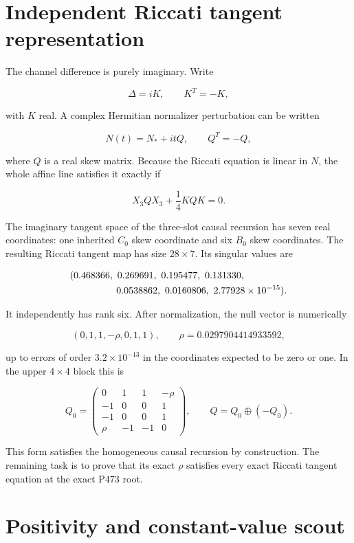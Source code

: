 \documentclass[11pt,a4paper,openany]{report}
\begin{document}
\section{Independent Riccati tangent representation}

The channel difference is purely imaginary. Write

\[
\Delta=iK,
\qquad K^T=-K,
\]

with \(K\) real. A complex Hermitian normalizer perturbation can be written

\[
N(t)=N_*+itQ,
\qquad Q^T=-Q,
\]

where \(Q\) is a real skew matrix. Because the Riccati equation is linear in \(N\), the whole affine line satisfies it exactly if

\[
\boxed{X_3QX_3+\frac14KQK=0.}
\]

The imaginary tangent space of the three-slot causal recursion has seven real coordinates: one inherited \(C_0\) skew coordinate and six \(B_0\) skew coordinates. The resulting Riccati tangent map has size \(28\times7\). Its singular values are

\[
\begin{aligned}
&(0.468366,\ 0.269691,\ 0.195477,\ 0.131330,\\
&\hspace{17mm}0.0538862,\ 0.0160806,\ 2.77928\times10^{-15}).
\end{aligned}
\]

It independently has rank six. After normalization, the null vector is numerically

\[
(0,1,1,-\rho,0,1,1),
\qquad
\rho=0.0297904414933592,
\]

up to errors of order \(3.2\times10^{-13}\) in the coordinates expected to be zero or one. In the upper \(4\times4\) block this is

\[
Q_0=
\begin{pmatrix}
0&1&1&-\rho\\
-1&0&0&1\\
-1&0&0&1\\
\rho&-1&-1&0
\end{pmatrix},
\qquad
Q=Q_0\oplus(-Q_0).
\]

This form satisfies the homogeneous causal recursion by construction. The remaining task is to prove that its exact \(\rho\) satisfies every exact Riccati tangent equation at the exact P473 root.

\section{Positivity and constant-value scout}
\end{document}
